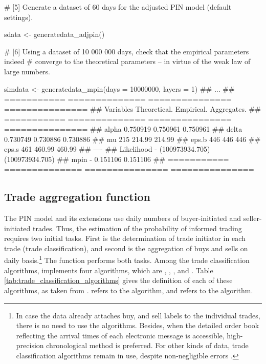 \begin{example}
# [5] Generate a dataset of 60 days for the adjusted PIN model (default settings).

sdata <- generatedata_adjpin()
\end{example} 


\begin{example}
# [6] Using a dataset of 10 000 000 days, check that the empirical parameters indeed 
# converge to the theoretical parameters – in virtue of the weak law of large numbers.

simdata <- generatedata_mpin(days = 10000000, layers = 1)
## ...
## ===========  ==============  ===============  ===============
## Variables    Theoretical.    Empirical.       Aggregates.    
## ===========  ==============  ===============  ===============
## alpha        0.750919        0.750961         0.750961       
## delta        0.730749        0.730886         0.730886       
## mu           215             214.99           214.99         
## eps.b        446             446              446            
## eps.s        461             460.99           460.99         
## ----                                                         
## Likelihood   -               (100973934.705)  (100973934.705)
## mpin         -               0.151106         0.151106       
## ===========  ==============  ===============  ===============
\end{example} 

\subsection{Trade aggregation function}

The PIN model and its extensions use daily numbers of buyer-initiated and seller-initiated trades. Thus, the estimation of the probability of informed trading requires two initial tasks. First is the determination of trade initiator in each trade (trade classification), and second is the aggregation of buys and sells on daily basis.\footnote{In case the data already attaches buy, and sell labels to the individual trades, there is no need to use the algorithms. Besides, when the detailed order book reflecting the arrival times of each electronic message is accessible, high-precision \cite{Odders-White2000On} chronological method is preferred. For other kinds of data, trade classification algorithms remain in use, despite non-negligible errors \citep[see e.g.,][]{Lee1991Inferring, Piwowar2006Sensitivity,Aktas2014Trade}.} The function  performs both tasks. Among the trade classification algorithms,  implements four algorithms, which are , , , and . Table \ref{tab:trade_classification_algorithms} gives the definition of each of these algorithms, as taken from  \cite{Aktas2014Trade}.  refers to the \cite{Lee1991Inferring} algorithm, and  refers to the \cite{Ellis2000Accuracy} algorithm. 

